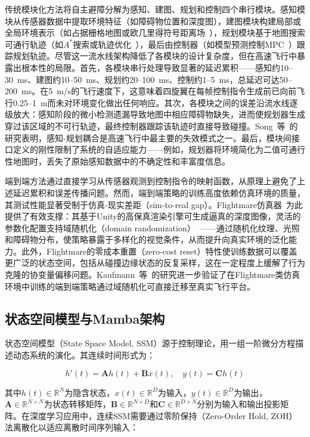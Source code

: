 \documentclass[12pt,a4paper]{article}
\numberwithin{equation}{section}
\numberwithin{figure}{section}
\numberwithin{table}{section}
\begin{document}
传统模块化方法将自主避障分解为感知、建图、规划和控制四个串行模块。感知模块从传感器数据中提取环境特征（如障碍物位置和深度图），建图模块构建局部或全局环境表示（如占据栅格地图或欧几里得符号距离场~\cite{foehn2021time}），规划模块基于地图搜索可通行轨迹（如$A^*$搜索或轨迹优化~\cite{romero2022mpcc}），最后由控制器（如模型预测控制MPC~\cite{kaufmann2023champion}）跟踪规划轨迹。尽管这一流水线架构降低了各模块的设计复杂度，但在高速飞行中暴露出根本性的局限。首先，各模块串行处理导致显著的延迟累积——感知约10--30~ms、建图约10--50~ms、规划约20--100~ms、控制约1--5~ms，总延迟可达50--200~ms。在5~m/s的飞行速度下，这意味着四旋翼在每帧控制指令生成前已向前飞行0.25--1~m而未对环境变化做出任何响应。其次，各模块之间的误差沿流水线逐级放大：感知阶段的微小检测遗漏导致地图中相应障碍物缺失，进而使规划器生成穿过该区域的不可行轨迹，最终控制器跟踪该轨迹时直接导致碰撞。Song~等~\cite{song2023perception}的研究表明，感知-规划耦合是高速飞行中最主要的失效模式之一。最后，模块间接口定义的刚性限制了系统的自适应能力——例如，规划器将环境简化为二值可通行性地图时，丢失了原始感知数据中的不确定性和丰富度信息。

端到端方法通过直接学习从传感器观测到控制指令的映射函数，从原理上避免了上述延迟累积和误差传播问题。然而，端到端策略的训练高度依赖仿真环境的质量，其测试性能显著受制于仿真-现实差距（sim-to-real gap）。Flightmare仿真器~\cite{shah2017flightmare}为此提供了有效支撑：其基于Unity的高保真渲染引擎可生成逼真的深度图像，灵活的参数化配置支持域随机化（domain randomization）~\cite{tobin2017domain}——通过随机化纹理、光照和障碍物分布，使策略暴露于多样化的视觉条件，从而提升向真实环境的泛化能力。此外，Flightmare的零成本重置（zero-cost reset）特性使训练数据可以覆盖更广泛的状态空间，包括从碰撞边缘状态的反复采样，这在一定程度上缓解了行为克隆的协变量偏移问题。Kaufmann~等~\cite{kaufmann2023champion}的研究进一步验证了在Flightmare类仿真环境中训练的端到端策略通过域随机化可直接迁移至真实飞行平台。

\subsection{状态空间模型与Mamba架构}

状态空间模型（State Space Model, SSM）源于控制理论，用一组一阶微分方程描述动态系统的演化。其连续时间形式为：

\begin{equation}
h'(t) = \mathbf{A} h(t) + \mathbf{B} x(t), \quad y(t) = \mathbf{C} h(t)
\label{eq:ssm_continuous}
\end{equation}

其中$h(t) \in \mathbb{R}^{N}$为隐含状态，$x(t) \in \mathbb{R}^{D}$为输入，$y(t) \in \mathbb{R}^{D}$为输出，$\mathbf{A} \in \mathbb{R}^{N \times N}$为状态转移矩阵，$\mathbf{B} \in \mathbb{R}^{N \times D}$和$\mathbf{C} \in \mathbb{R}^{D \times N}$分别为输入和输出投影矩阵。在深度学习应用中，连续SSM需要通过零阶保持（Zero-Order Hold, ZOH）法离散化以适应离散时间序列输入：
\end{document}
